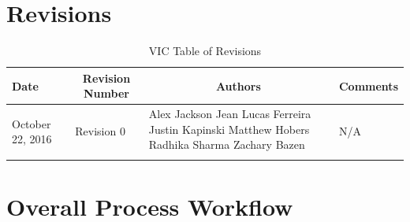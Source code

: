 \documentclass [12pt]{article}
\begin{document}

\pagebreak

\tableofcontents
\listoftables

\pagebreak


\section{Revisions}
\begin{longtable}{| p{ } | p{ } | p{ } | p{ } |}

\hline 
\centering \textbf{Date} & 
\multicolumn{1}{c}{\textbf {Revision Number}} &
\multicolumn{1}{|c}{\textbf {Authors}} & 
\multicolumn{1}{|c|}{\textbf {Comments}} \\ \hline

\multirow{4}{*}{\centering October 22, 2016}  & 
\multirow{4}{*}{Revision 0}& 
{Alex Jackson \newline
Jean Lucas Ferreira \newline
Justin Kapinski\newline
Matthew Hobers\newline
Radhika Sharma\newline
Zachary Bazen}
&
 \multirow{4}{*}{N/A} \\ 
\hline 

\caption{VIC Table of Revisions} 
\end{longtable}








\pagebreak


\section{Overall Process Workflow}
\end{document}
